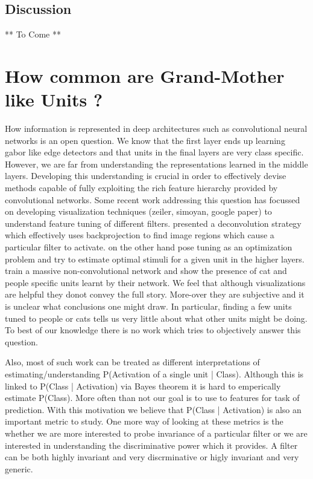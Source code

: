 \documentclass[runningheads]{llncs}
\begin{document}
\subsection{Discussion}
** To Come ** 

\section{How common are Grand-Mother like Units ?}
How information is represented in deep architectures such as convolutional neural networks is an open question. We know that the first layer ends up learning gabor like edge detectors and that units in the final layers are very class specific. However, we are far from understanding the representations learned in the middle layers. Developing this understanding is crucial in order to effectively devise methods capable of fully exploiting the rich feature hierarchy provided by convolutional networks.
Some recent work addressing this question has focussed on developing visualization techniques (zeiler, simoyan, google paper) to understand feature tuning of different filters. \cite{zeiler} presented a deconvolution strategy which effectively uses backprojection to find image regions which cause a particular filter to activate.  \cite{simoyan} on the other hand pose tuning as an optimization problem and try to estimate optimal stimuli for a given unit in the higher layers. \cite{google} train a massive non-convolutional network and show the presence of cat and people specific units learnt by their network. We feel that although visualizations are helpful they donot convey the full story. More-over they are subjective and it is unclear what conclusions one might draw. In particular, finding a few units tuned to people or cats tells us very little about what other units might be doing. To best of our knowledge there is no work which tries to objectively answer this question.

Also, most of such work can be treated as different interpretations of estimating/understanding P(Activation of a single unit | Class). Although this is linked to P(Class | Activation) via Bayes theorem it is hard to emperically estimate P(Class). More often than not our goal is to use to features for task of prediction. With this motivation we believe that P(Class | Activation) is also an important metric to study. One more way of looking at these metrics is the whether we are more interested to probe invariance of a particular filter or we are interested in understanding the discriminative power which it provides. A filter can be both highly invariant and very discrminative or higly invariant and very generic.  
\end{document}
